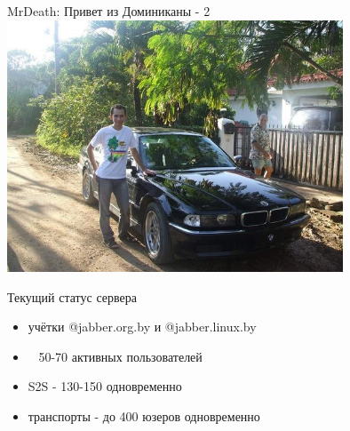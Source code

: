 \begin{frame}{MrDeath: Привет из Доминиканы - 2}
  \includegraphics[width=10cm]{avb_with_black_boomer}
\end{frame}

\begin{frame}{Текущий статус сервера}
   \begin{itemize}
      \item учётки @jabber.org.by и @jabber.linux.by
      \item ~ 50-70 активных пользователей
      \item S2S - 130-150 одновременно
      \item транспорты - до 400 юзеров одновременно
    \end{itemize}
\end{frame}



